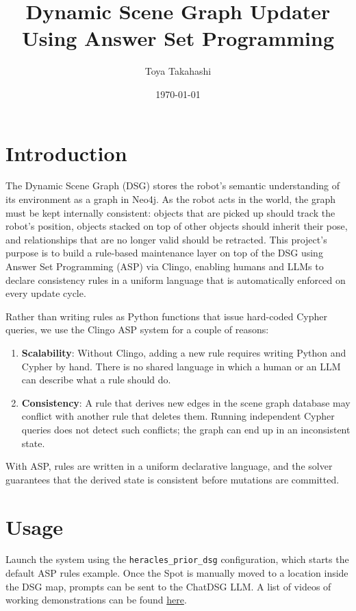 \documentclass{article}
\title{Dynamic Scene Graph Updater Using Answer Set Programming}
\author{Toya Takahashi}
\date\today
\begin{document}
\maketitle

\section{Introduction}

The Dynamic Scene Graph (DSG) stores the robot's semantic understanding of its
environment as a graph in Neo4j. As the robot acts in the world,
the graph must be kept internally consistent: objects that are picked up
should track the robot's position, objects stacked on top of other objects
should inherit their pose, and relationships that are no longer valid should
be retracted. This project's purpose is to build a rule-based maintenance
layer on top of the DSG using Answer Set Programming (ASP) via Clingo,
enabling humans and LLMs to declare consistency rules in a uniform language
that is automatically enforced on every update cycle.

Rather than writing rules as Python functions that issue hard-coded Cypher queries,
we use the Clingo ASP system for a couple of reasons:
\begin{enumerate}
    \item \textbf{Scalability}: Without Clingo, adding a new rule requires writing Python
    and Cypher by hand. There is no shared language in which a human or an
    LLM can describe what a rule should do.
    \item \textbf{Consistency}: A rule that derives new edges in the scene graph database may
    conflict with another rule that deletes them. Running independent Cypher queries does
    not detect such conflicts; the graph can end up in an inconsistent state.
\end{enumerate}

With ASP, rules are written in a uniform declarative
language, and the solver guarantees that the derived state is consistent
before mutations are committed.

\section{Usage}

Launch the system using the \texttt{heracles\_prior\_dsg} configuration,
which starts the default ASP rules example. Once the Spot is manually
moved to a location inside the DSG map, prompts can be sent to the
ChatDSG LLM. A list of videos of working demonstrations can be found \href{https://drive.google.com/drive/folders/1tmuuLWlVcYUE2DVNGgJkefhnm2Ud9j-Q?usp=sharing}{here}.
\end{document}
